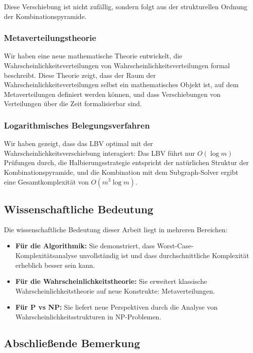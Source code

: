 ﻿\documentclass[a4paper,12pt]{article}
\theoremstyle{definition}
\begin{document}
Diese Verschiebung ist nicht zufällig, sondern folgt aus der strukturellen Ordnung der Kombinationspyramide.

\subsubsection{Metaverteilungstheorie}

Wir haben eine neue mathematische Theorie entwickelt, die Wahrscheinlichkeitsverteilungen von Wahrscheinlichkeitsverteilungen formal beschreibt. Diese Theorie zeigt, dass der Raum der Wahrscheinlichkeitsverteilungen selbst ein mathematisches Objekt ist, auf dem Metaverteilungen definiert werden können, und dass Verschiebungen von Verteilungen über die Zeit formalisierbar sind.

\subsubsection{Logarithmisches Belegungsverfahren}

Wir haben gezeigt, dass das LBV optimal mit der Wahrscheinlichkeitsverschiebung interagiert: Das LBV führt nur $O(\log m)$ Prüfungen durch, die Halbierungsstrategie entspricht der natürlichen Struktur der Kombinationspyramide, und die Kombination mit dem Subgraph-Solver ergibt eine Gesamtkomplexität von $O(m^3 \log m)$.

\subsection{Wissenschaftliche Bedeutung}

Die wissenschaftliche Bedeutung dieser Arbeit liegt in mehreren Bereichen:

\begin{itemize}
	\item \textbf{Für die Algorithmik:} Sie demonstriert, dass Worst-Case-Komplexitätsanalyse unvollständig ist und dass durchschnittliche Komplexität erheblich besser sein kann.
	
	\item \textbf{Für die Wahrscheinlichkeitstheorie:} Sie erweitert klassische Wahrscheinlichkeitstheorie auf neue Konstrukte: Metaverteilungen.
	
	\item \textbf{Für P vs NP:} Sie liefert neue Perspektiven durch die Analyse von Wahrscheinlichkeitsstrukturen in NP-Problemen.
\end{itemize}

\subsection{Abschließende Bemerkung}
\end{document}
